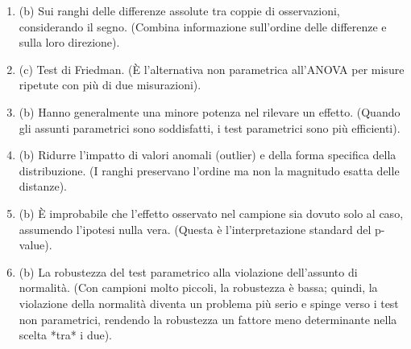 \documentclass[12pt, a4paper]{article}
\begin{document}
\begin{enumerate}[leftmargin=*, label=\arabic*.]
    \item (b) Sui ranghi delle differenze assolute tra coppie di osservazioni, considerando il segno. (Combina informazione sull'ordine delle differenze e sulla loro direzione).
    \item (c) Test di Friedman. (È l'alternativa non parametrica all'ANOVA per misure ripetute con più di due misurazioni).
    \item (b) Hanno generalmente una minore potenza nel rilevare un effetto. (Quando gli assunti parametrici sono soddisfatti, i test parametrici sono più efficienti).
    \item (b) Ridurre l'impatto di valori anomali (outlier) e della forma specifica della distribuzione. (I ranghi preservano l'ordine ma non la magnitudo esatta delle distanze).
    \item (b) È improbabile che l'effetto osservato nel campione sia dovuto solo al caso, assumendo l'ipotesi nulla vera. (Questa è l'interpretazione standard del p-value).
    \item (b) La robustezza del test parametrico alla violazione dell'assunto di normalità. (Con campioni molto piccoli, la robustezza è bassa; quindi, la violazione della normalità diventa un problema più serio e spinge verso i test non parametrici, rendendo la robustezza un fattore meno determinante nella scelta *tra* i due).
\end{enumerate}
\end{document}
